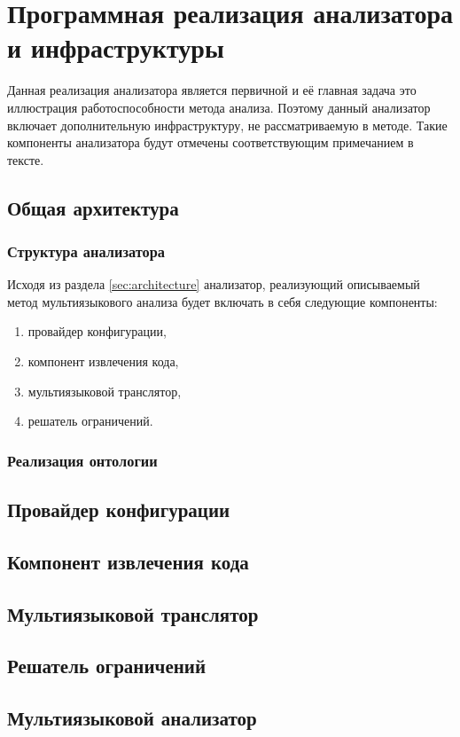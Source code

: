 \chapter{Программная реализация анализатора и инфраструктуры}

Данная реализация анализатора является первичной и её главная задача это иллюстрация работоспособности метода анализа.
Поэтому данный анализатор включает дополнительную инфраструктуру, не рассматриваемую в методе. Такие компоненты
анализатора будут отмечены соответствующим примечанием в тексте.

\section{Общая архитектура}

\subsection{Структура анализатора}

Исходя из раздела \ref{sec:architecture} анализатор, реализующий описываемый метод мультиязыкового анализа будет включать в себя следующие
компоненты:
\begin{enumerate}[1)]
    \item провайдер конфигурации,
    \item компонент извлечения кода,
    \item мультиязыковой транслятор,
    \item решатель ограничений.
\end{enumerate}


\subsection{Реализация онтологии}

\section{Провайдер конфигурации}

\section{Компонент извлечения кода}

\section{Мультиязыковой транслятор}

\section{Решатель ограничений}

\section{Мультиязыковой анализатор}

